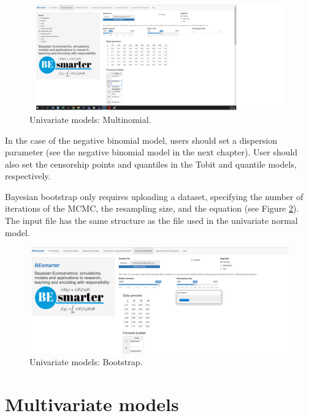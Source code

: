 \begin{figure}
	\includegraphics[width=340pt, height=130pt]{Chapters/chapterGUI/figures/Figure4.png}
	\caption[List of figure caption goes here]{Univariate models: Multinomial.}\label{fig64}
\end{figure}

In the case of the negative binomial model, users should set a dispersion parameter (see the negative binomial model in the next chapter). User should also set the censorship points and quantiles in the Tobit and quantile models, respectively.

Bayesian bootstrap only requires uploading a dataset, specifying the number of iterations of the MCMC, the resampling size, and the equation (see Figure \ref{fig65}).
The input file has the same structure as the file used in the univariate normal model.

\begin{figure}
	\includegraphics[width=340pt, height=130pt]{Chapters/chapterGUI/figures/Figure5.png}
	\caption[List of figure caption goes here]{Univariate models: Bootstrap.}\label{fig65}
\end{figure}  

\section{Multivariate models}\label{secGUI3}

